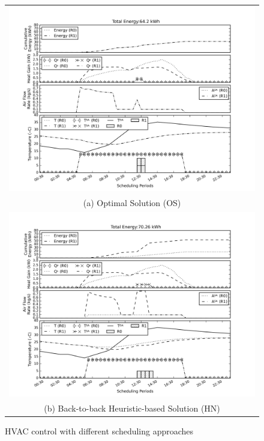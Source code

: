 \begin{figure}
\begin{tabular}{c}
  \includegraphics[width=0.9\linewidth]{figs/lrlc_opt_ws.png} \\
(a) Optimal Solution (OS) \\[6pt]
  \includegraphics[width=0.9\linewidth]{figs/lrlc_b2b_ns.png} \\
(b) Back-to-back Heuristic-based Solution (HN) \\[6pt]
\end{tabular}
\caption{HVAC control with different scheduling approaches}
\label{fig:mip_scheap}
\end{figure}

